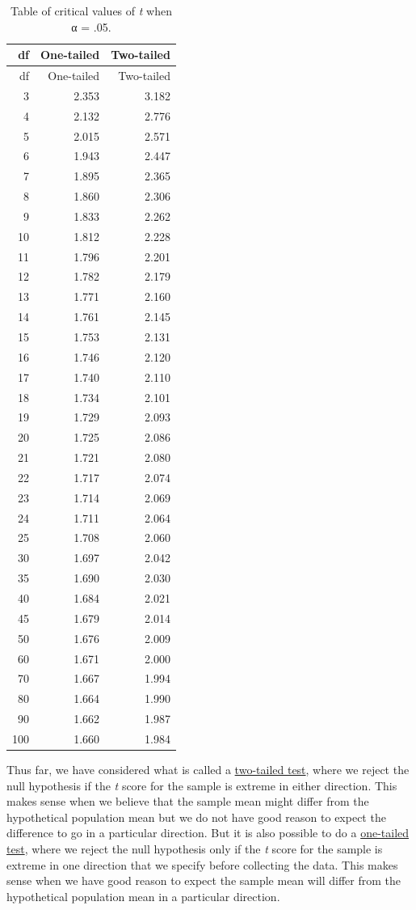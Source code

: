 \documentclass[
]{krantz}
\begin{document}
\begin{longtable}[]{@{}rrr@{}}
\caption{\label{tab:tcrit} Table of critical values of \emph{t} when α = .05.}\tabularnewline
\toprule()
df & One-tailed & Two-tailed \\
\midrule()
\endfirsthead
\toprule()
df & One-tailed & Two-tailed \\
\midrule()
\endhead
3 & 2.353 & 3.182 \\
4 & 2.132 & 2.776 \\
5 & 2.015 & 2.571 \\
6 & 1.943 & 2.447 \\
7 & 1.895 & 2.365 \\
8 & 1.860 & 2.306 \\
9 & 1.833 & 2.262 \\
10 & 1.812 & 2.228 \\
11 & 1.796 & 2.201 \\
12 & 1.782 & 2.179 \\
13 & 1.771 & 2.160 \\
14 & 1.761 & 2.145 \\
15 & 1.753 & 2.131 \\
16 & 1.746 & 2.120 \\
17 & 1.740 & 2.110 \\
18 & 1.734 & 2.101 \\
19 & 1.729 & 2.093 \\
20 & 1.725 & 2.086 \\
21 & 1.721 & 2.080 \\
22 & 1.717 & 2.074 \\
23 & 1.714 & 2.069 \\
24 & 1.711 & 2.064 \\
25 & 1.708 & 2.060 \\
30 & 1.697 & 2.042 \\
35 & 1.690 & 2.030 \\
40 & 1.684 & 2.021 \\
45 & 1.679 & 2.014 \\
50 & 1.676 & 2.009 \\
60 & 1.671 & 2.000 \\
70 & 1.667 & 1.994 \\
80 & 1.664 & 1.990 \\
90 & 1.662 & 1.987 \\
100 & 1.660 & 1.984 \\
\bottomrule()
\end{longtable}

Thus far, we have considered what is called a \protect\hyperlink{two-tailed-test}{two-tailed test}, where we reject the null hypothesis if the \emph{t} score for the sample is extreme in either direction. This makes sense when we believe that the sample mean might differ from the hypothetical population mean but we do not have good reason to expect the difference to go in a particular direction. But it is also possible to do a \protect\hyperlink{one-tailed-test}{one-tailed test}, where we reject the null hypothesis only if the \emph{t} score for the sample is extreme in one direction that we specify before collecting the data. This makes sense when we have good reason to expect the sample mean will differ from the hypothetical population mean in a particular direction.
\end{document}
